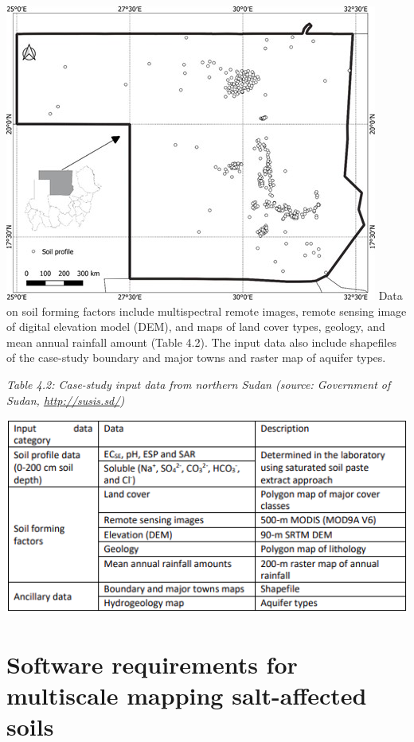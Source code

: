 \documentclass[
  10pt,
  b5paper,
]{book}
\begin{document}
\includegraphics{figures/images/Figure4.2.jpg}
Data on soil forming factors include multispectral remote images, remote sensing image of digital elevation model (DEM), and maps of land cover types, geology, and mean annual rainfall amount (Table 4.2). The input data also include shapefiles of the case-study boundary and major towns and raster map of aquifer types.

\emph{Table 4.2: Case-study input data from northern Sudan (source: Government of Sudan, \url{http://susis.sd/})}

\includegraphics{figures/tables/Table_4.2.png}

\hypertarget{software-requirements-for-multiscale-mapping-salt-affected-soils}{%
\section{Software requirements for multiscale mapping salt-affected soils}\label{software-requirements-for-multiscale-mapping-salt-affected-soils}}
\end{document}
